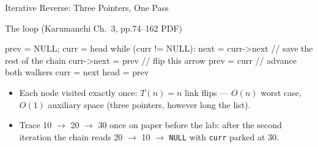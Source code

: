 \documentclass[aspectratio=169]{beamer}
\begin{document}
\begin{frame}[fragile]{Iterative Reverse: Three Pointers, One Pass}
  \begin{block}{The loop (Karumanchi Ch.~3, pp.74--162 PDF)}
\begin{semiverbatim}
prev = NULL; curr = head
while (curr != NULL):
    next = curr->next   // save the rest of the chain
    curr->next = prev   // flip this arrow
    prev = curr         // advance both walkers
    curr = next
head = prev
\end{semiverbatim}
  \end{block}
  \begin{itemize}
    \item Each node visited exactly once: $T(n) = n$ link flips --- $O(n)$
      worst case, $O(1)$ auxiliary space (three pointers, however long the
      list).
    \item Trace 10 $\to$ 20 $\to$ 30 once on paper before the lab: after the
      second iteration the chain reads 20 $\to$ 10 $\to$ \texttt{NULL} with
      \texttt{curr} parked at 30.
  \end{itemize}
\end{frame}
\end{document}
